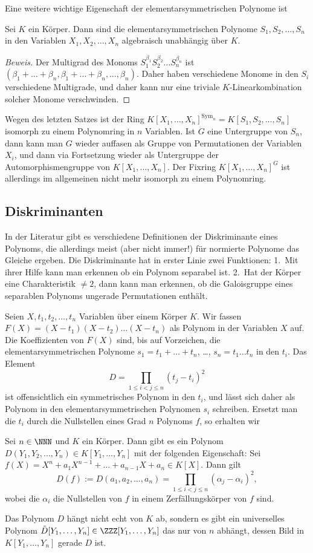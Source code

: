 \documentclass[12pt,a4paper,twoside]{article}
\begin{document}
Eine weitere wichtige Eigenschaft der elementarsymmetrischen Polynome ist
\begin{Satz}
  Sei $K$ ein K\"orper. Dann sind die elementarsymmetrischen Polynome
  $S_1,S_2,\dots,S_n$ in den Variablen $X_1,X_2,\dots,X_n$ algebraisch
  unabh\"angig \"uber $K$.
\end{Satz}
\begin{proof}[Beweis]
  Der Multigrad des Monoms $S_1^{\beta_1}S_2^{\beta_2}\dots S_n^{\beta_n}$ ist
  $(\beta_1+\dots+\beta_n,\beta_1+\dots+\beta_n,\dots,\beta_n)$. Daher haben
  verschiedene Monome in den $S_i$ verschiedene Multigrade, und daher kann nur
  eine triviale $K$-Linearkombination solcher Monome verschwinden.
\end{proof}
\begin{Bemerkung*}
  Wegen des letzten Satzes ist der Ring
  $K[X_1,\dots,X_n]^{\text{Sym}_n}=K[S_1,S_2,\dots,S_n]$ isomorph zu einem
  Polynomring in $n$ Variablen. Ist $G$ eine Untergruppe von $S_n$, dann kann
  man $G$ wieder auffasen als Gruppe von Permutationen der Variablen $X_i$,
  und dann via Fortsetzung wieder als Untergruppe der Automorphismengruppe von
  $K[X_1,\dots,X_n]$. Der Fixring $K[X_1,\dots,X_n]^G$ ist allerdings im
  allgemeinen nicht mehr isomorph zu einem Polynomring.
\end{Bemerkung*}
\subsection{Diskriminanten}
In der Literatur gibt es verschiedene Definitionen der Diskriminante eines
Polynoms, die allerdings meist (aber nicht immer!) f\"ur normierte Polynome
das Gleiche ergeben. Die Diskriminante hat in erster Linie zwei Funktionen:
1.\ Mit ihrer Hilfe kann man erkennen ob ein Polynom separabel ist. 2.\ Hat
der K\"orper eine Charakteristik $\ne2$, dann kann man erkennen, ob die
Galoisgruppe eines separablen Polynoms ungerade Permutationen enth\"alt.

Seien $X,t_1,t_2,\dots,t_n$ Variablen \"uber einem K\"orper $K$. Wir fassen
$F(X)=(X-t_1)(X-t_2)\dots(X-t_n)$ als Polynom in der Variablen $X$ auf. Die
Koeffizienten von $F(X)$ sind, bis auf Vorzeichen, die elementarsymmetrischen
Polynome $s_1=t_1+\dots+t_n$, \dots, $s_n=t_1\dots t_n$ in den $t_i$. Das
Element
\[
D=\prod_{1\le i<j\le n}(t_j-t_i)^2
\]
ist offensichtlich ein symmetrisches Polynom in den $t_i$, und l\"asst sich
daher als Polynom in den elementarsymmetrischen Polynomen $s_i$
schreiben. Ersetzt man die $t_i$ durch die Nullstellen eines Grad $n$ Polynoms
$f$, so erhalten wir
\begin{Satz}
  Sei $n\in\NNN$ und $K$ ein K\"orper. Dann gibt es ein Polynom
  $D(Y_1,Y_2,\dots,Y_n)\in K[Y_1,\dots,Y_n]$ mit der folgenden Eigenschaft:
  Sei $f(X)=X^n+a_1X^{n-1}+\dots+a_{n-1}X+a_n\in K[X]$. Dann gilt
\[
D(f):=D(a_1,a_2,\dots,a_n)=\prod_{1\le i<j\le n}(\alpha_j-\alpha_i)^2,
\]
wobei die $\alpha_i$ die Nullstellen von $f$ in einem Zerf\"allungsk\"orper
von $f$ sind.
\end{Satz}
Das Polynom $D$ h\"angt nicht echt von $K$ ab, sondern es gibt ein
universelles Polynom $\tilde D[Y_1,\dots,Y_n]\in\ZZZ[Y_1,\dots,Y_n]$ das nur
von $n$ abh\"angt, dessen Bild in $K[Y_1,\dots,Y_n]$ gerade $D$ ist.
\end{document}
